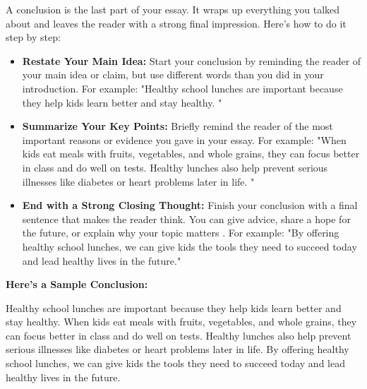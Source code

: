 \documentclass[12pt]{article}
\begin{document}
\begin{tcolorbox}[colframe=black!60, colback=white, 
coltitle=black, colbacktitle=black!15, fonttitle=\bfseries\Large, 
title=Example: How to Write a Conclusion, halign title=center, left=10pt, right=10pt, top=10pt, bottom=15pt]
A conclusion is the last part of your essay. It wraps up everything you talked about and leaves the reader with a strong final impression.  Here’s how to do it step by step:

\begin{itemize}
    \item \textbf{Restate Your Main Idea:} Start your conclusion by reminding the reader of your main idea or claim, but use different words than you did in your introduction. For example: "Healthy school lunches are important because they help kids learn better and stay healthy. "
\end{itemize}
\begin{itemize}
    \item \textbf{Summarize Your Key Points:} Briefly remind the reader of the most important reasons or evidence you gave in your essay. For example: "When kids eat meals with fruits, vegetables, and whole grains, they can focus better in class and do well on tests. Healthy lunches also help prevent serious illnesses like diabetes or heart problems later in life. "
\end{itemize}
\begin{itemize}
    \item \textbf{End with a Strong Closing Thought:} Finish your conclusion with a final sentence that makes the reader think. You can give advice, share a hope for the future, or explain why your topic matters . For example: "By offering healthy school lunches, we can give kids the tools they need to succeed today and lead healthy lives in the future."
\end{itemize}

\textbf{Here’s a Sample Conclusion:}

Healthy school lunches are important because they help kids learn better and stay healthy. When kids eat meals with fruits, vegetables, and whole grains, they can focus better in class and do well on tests. Healthy lunches also help prevent serious illnesses like diabetes or heart problems later in life. By offering healthy school lunches, we can give kids the tools they need to succeed today and lead healthy lives in the future.
\end{tcolorbox}
\end{document}
